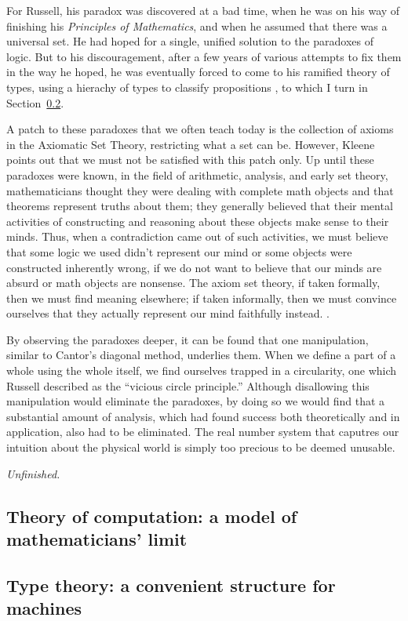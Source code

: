 \documentclass[10pt]{article}
\begin{document}
For Russell, his paradox was discovered at a bad time, when he was on his way
of finishing his \emph{Principles of Mathematics}, and when he assumed that
there was a universal set. He had hoped for a single, unified solution to the
paradoxes of logic. But to his discouragement, after a few years of various
attempts to fix them in the way he hoped, he was eventually forced to come to
his ramified theory of types, using a hierachy of types to classify
propositions \cite{companion.to.russell.tt}, to which I turn in
Section~\ref{sec.tt}. 

A patch to these paradoxes that we often teach today is the collection of
axioms in the Axiomatic Set Theory, restricting what a set can be. However,
Kleene points out that we must not be satisfied with this patch only. Up until
these paradoxes were known, in the field of arithmetic, analysis, and early set
theory, mathematicians thought they were dealing with complete math objects and
that theorems represent truths about them; they generally believed that their
mental activities of constructing and reasoning about these objects make sense
to their minds. Thus, when a contradiction came out of such activities, we must
believe that some logic we used didn't represent our mind or some objects were
constructed inherently wrong, if we do not want to believe that our minds are
absurd or math objects are nonsense.  The axiom set theory, if taken formally,
then we must find meaning elsewhere; if taken informally, then we must convince
ourselves that they actually represent our mind faithfully instead.
\cite[Ch.~12]{kleeneitmm}. 

By observing the paradoxes deeper, it can be found that one manipulation,
similar to Cantor's diagonal method, underlies them. When we define a part of a
whole using the whole itself, we find ourselves trapped in a circularity, one
which Russell described as the ``vicious circle principle.'' Although
disallowing this manipulation would eliminate the paradoxes, by doing so we
would find that a substantial amount of analysis, which had found success
both theoretically and in application, also had to be eliminated. The real
number system that caputres our intuition about the physical world is simply
too precious to be deemed unusable.


\emph{Unfinished.}

\subsection[Theory of computation]{Theory of computation: a model of
mathematicians' limit}

\subsection[Type theory]{Type theory: a convenient structure for machines}
\label{sec.tt}






\end{document}

